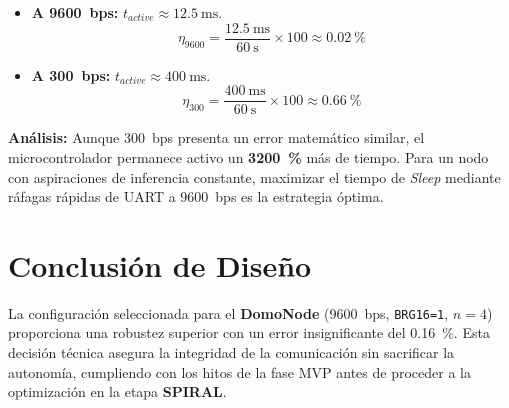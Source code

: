 \documentclass[11pt,a4paper]{article}
\begin{document}
\begin{itemize}
    \item \textbf{A \SI{9600}{bps}:} $t_{active} \approx \SI{12.5}{\milli\second}$.
    \begin{equation}
    \eta_{9600} = \frac{\SI{12.5}{\milli\second}}{\SI{60}{\second}} \times 100 \approx \SI{0.02}{\percent}
    \end{equation}
    
    \item \textbf{A \SI{300}{bps}:} $t_{active} \approx \SI{400}{\milli\second}$.
    \begin{equation}
    \eta_{300} = \frac{\SI{400}{\milli\second}}{\SI{60}{\second}} \times 100 \approx \SI{0.66}{\percent}
    \end{equation}
\end{itemize}

\textbf{Análisis:} Aunque \SI{300}{bps} presenta un error matemático similar, el microcontrolador permanece activo un \textbf{\SI{3200}{\percent}} más de tiempo. Para un nodo con aspiraciones de inferencia constante, maximizar el tiempo de \textit{Sleep} mediante ráfagas rápidas de UART a \SI{9600}{bps} es la estrategia óptima.

\section{Conclusión de Diseño}
La configuración seleccionada para el \textbf{DomoNode} (\SI{9600}{bps}, \texttt{BRG16=1}, $n=4$) proporciona una robustez superior con un error insignificante del \SI{0.16}{\percent}. Esta decisión técnica asegura la integridad de la comunicación sin sacrificar la autonomía, cumpliendo con los hitos de la fase MVP antes de proceder a la optimización en la etapa \textbf{SPIRAL}.
\end{document}
